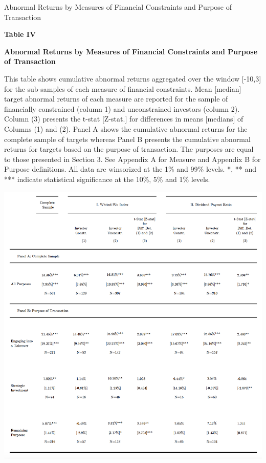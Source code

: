 \documentclass[12pt]{article}
\begin{document}
\begin{table}[!htbp]
	\centering
	\captionsetup{textformat=empty,labelformat=blank}
	\caption{Abnormal Returns by Measures of Financial Constraints and Purpose of Transaction}
	\textbf{Table IV}\par\medskip
	\large\textbf{Abnormal Returns by Measures of Financial Constraints and Purpose of Transaction}\par\medskip
	\justifying
	\footnotesize\noindent{}This table shows cumulative abnormal returns aggregated over the window [-10,3] for the sub-samples of each measure of financial constraints. Mean [median] target abnormal returns of each measure are reported for the sample of financially constrained (column 1) and unconstrained investors (column 2). Column (3) presents the t-stat [Z-stat.] for differences in means [medians] of Columns (1) and (2). Panel A shows the cumulative abnormal returns for the complete sample of targets whereas Panel B presents the cumulative abnormal returns for targets based on the purpose of transaction. The purposes are equal to those presented in Section 3. See Appendix A for Measure and Appendix B for Purpose definitions. All data are winsorized at the 1\% and 99\% levels. *, ** and *** indicate statistical significance at the 10\%, 5\% and 1\% levels.  \par\medskip
	\centering													
	\begin{adjustbox}{width=\textwidth}
		\includegraphics{ar_measure1_final}
	\end{adjustbox}\par\medskip
\end{table}
\end{document}
